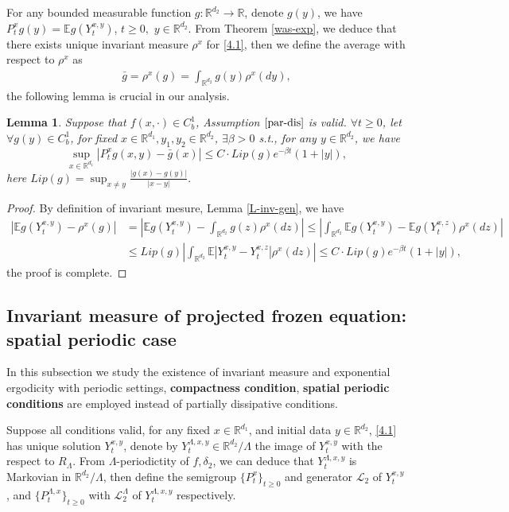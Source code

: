 \documentclass[11pt,reqno]{amsart}
\newtheorem{lemma}{\indent Lemma}[section]
\numberwithin{equation}{section}
\newcommand{\R}{\mathbb{R}}
\begin{document}
For any bounded measurable function $g:\mathbb{R}^{d_{2}}\rightarrow \mathbb{R}$, denote $ g(y)$, we have
$ P_{t}^{x}g(y)=\mathbb{E}g(Y_{t}^{ x,y})$,  $t\geq 0,$  $y\in \mathbb{R}^{d_{2}}.$ From Theorem \ref{was-exp}, we deduce that there exists unique invariant measure $\rho^x$ for \eqref{4.1}, then we define the average with respect to $\rho^x$ as
\begin{align*}
	\bar{g}=\rho^x(g)=\int_{\R^{d_2}}g(y)\rho^x(dy),
\end{align*}
 the following lemma is crucial in our analysis.
\begin{lemma}\label{L-gen-exp}
	Suppose that $ f(x,\cdot)\in C^{1}_{b}$, Assumption $\ref{par-dis}$ is valid. $\forall  t\geq0$,  let $\forall g(y)\in C^{1}_{b}$, for fixed $x\in \mathbb{R}^{d_{1}},  y_{1}, y_{2}\in \mathbb{R}^{d_{2}}$, $\exists \beta>0$ s.t., for any $y\in \mathbb{R}^{d_{2}}$, we have 
	$$ \sup_{x\in \mathbb{R}^{d_{1}}}| P_{t}^{x}g(x,y)-\bar{g}(x)|\leq C\cdot Lip(g)e^{-\beta t}(1+|y|),$$
	here $ Lip(g)=\sup_{x\neq y}\frac{|g(x)-g(y)|}{|x-y|}.$
\end{lemma}
\begin{proof}
By definition of invariant mesure, Lemma \ref{L-inv-gen}, we have
\begin{align*}
|\mathbb{E}g(Y_t^{x,y})-\rho^x(g)|&=
\left|\mathbb{E}g(Y_t^{x,y})-\int_{\R^{d_2}}g(z)\rho^x(dz)\right|\leq\left|\int_{\R^{d_2}}\mathbb{E}g(Y_t^{x,y})-\mathbb{E}g(Y_t^{x,z})\rho^x(dz)\right|\\
&\leq Lip(g) \left|\int_{\R^{d_2}}\mathbb{E}|Y_t^{x,y}-Y_t^{x,z}|\rho^x(dz)\right|\leq C\cdot Lip(g)e^{-\beta t}(1+|y|),
\end{align*}
the proof is complete.
\end{proof}







\iffalse
\subsection{Invariant measure of projected frozen equation: spatial periodic case}\label{inv-per}
In this subsection we study the existence of invariant measure and exponential ergodicity  with periodic settings, \textbf{compactness condition}, \textbf{spatial periodic conditions} are employed instead of partially dissipative conditions. 

Suppose all conditions valid, for any fixed  $x\in\mathbb{R}^{d_{1}}$, and initial data $y\in\mathbb{R}^{d_{2}}$, \eqref{4.1} has unique solution $Y_{t}^{x,y} $, denote by $Y_{t}^{\Lambda,x,y}\in \mathbb{R}^{d_{2}}/\Lambda$ the image of $Y_{t}^{x,y}$ with the respect to $R_{\Lambda}$.
From $\Lambda$-periodictity of $f, \delta_{2}$, we can deduce that $Y_{t}^{\Lambda,x,y}$ is Markovian in $\mathbb{R}^{d_{2}}/\Lambda$, then define the semigroup $ \{P_{t}^{x}\}_{t\geq 0} $ and generator $\mathcal{L}_{2}$ of $Y_{t}^{x,y}$, and $\{P_{t}^{\Lambda,x}\}_{t\geq 0} $ with $\mathcal{L}_{2}^{\Lambda}$ of $Y_{t}^{\Lambda,x,y}$ respectively. 
\end{document}
